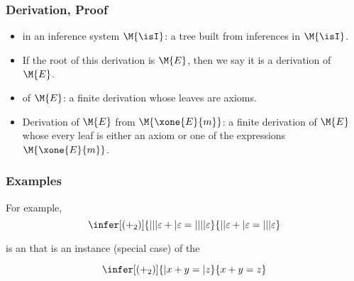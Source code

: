 
                        \begin{frame}\frametitle{Derivation, Proof}


\begin{itemize}
\item {} in an inference system $\M{\isI}$: a tree
built from inferences in $\M{\isI}$.

\item
If the root of this derivation is $\M{E}$, then we say it is a
\alert{derivation of $\M{E}$}.

\item {} of $\M{E}$: a finite derivation whose leaves 
are axioms.

\item \alert{Derivation of $\M{E}$ from $\M{\xone{E}{m}}$:}
a finite derivation of $\M{E}$ whose every leaf is either
an axiom or one of the expressions $\M{\xone{E}{m}}$.
\end{itemize}

                               \end{frame}


                        \begin{frame}\frametitle{Examples}

For example,
 \[
  \infer[(+_2)]{|||\varepsilon + |\varepsilon = ||||\varepsilon}{
    ||\varepsilon + |\varepsilon = |||\varepsilon}
  \]

is an  that is an instance (special case) of the

  \[
  \infer[(+_2)]{|x + y = |z}{x + y = z}
  \]


\medskip


                               \end{frame}


